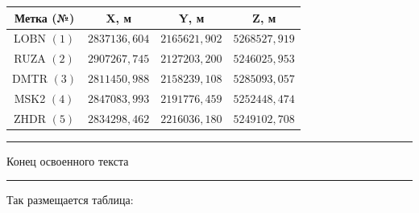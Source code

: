 \begin{table} [htbp]
	\centering\small
	\label{tab:tab24}{
	\begin{tabular}{|c|c|c|c|}
		\hline
		\textbf{Метка (№)}			& \textbf{X, м}		& \textbf{Y, м}		& \textbf{Z, м}		\\ \hline
		LOBN $(1)$					& $2837136,604$		& $2165621,902$		& $5268527,919$		\\ \hline
		RUZA $(2)$					& $2907267,745$		& $2127203,200$		& $5246025,953$		\\ \hline
		DMTR $(3)$					& $2811450,988$		& $2158239,108$		& $5285093,057$		\\ \hline
		MSK2 $(4)$					& $2847083,993$		& $2191776,459$		& $5252448,474$		\\ \hline
		ZHDR $(5)$					& $2834298,462$		& $2216036,180$		& $5249102,708$		\\ \hline
	\end{tabular}
	}
\end{table}
	



































\vfill
\noindent\rule{\textwidth}{.1pt}
\begin{center}				Конец освоенного текста					\end{center}
\noindent\rule{\textwidth}{1pt}
\newpage
\newpage


















Так размещается таблица:

